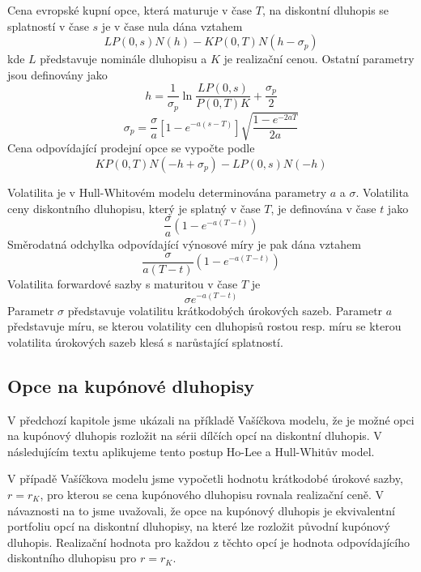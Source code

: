 \documentclass[a4paper]{book}
\begin{document}
Cena evropské kupní opce, která maturuje v čase $T$, na diskontní dluhopis se splatností v čase $s$ je v čase nula dána vztahem
\begin{equation*}
LP(0,s)N(h)-KP(0,T)N(h-\sigma_p)
\end{equation*}
kde $L$ představuje nominále dluhopisu a $K$ je realizační cenou. Ostatní parametry jsou definovány jako
\begin{equation*}
h = \frac{1}{\sigma_p} \ln \frac{LP(0,s)}{P(0,T)K}+\frac{\sigma_p}{2}
\end{equation*}
\begin{equation*}
\sigma_p = \frac{\sigma}{a}[1-e^{-a(s-T)}]\sqrt{\frac{1-e^{-2aT}}{2a}}
\end{equation*}
Cena odpovídající prodejní opce se vypočte podle
\begin{equation*}
KP(0,T)N(-h + \sigma_p)-LP(0,s)N(-h)
\end{equation*}

Volatilita je v Hull-Whitovém modelu determinována parametry $a$ a $\sigma$. Volatilita ceny diskontního dluhopisu, který je splatný v čase $T$, je definována v čase $t$ jako
\begin{equation*}
\frac{\sigma}{a}(1-e^{-a(T-t)})
\end{equation*}
Směrodatná odchylka odpovídající výnosové míry je pak dána vztahem
\begin{equation*}
\frac{\sigma}{a(T-t)}(1-e^{-a(T-t)})
\end{equation*}
Volatilita forwardové sazby s maturitou v čase $T$ je
\begin{equation*}
\sigma e^{-a(T-t)}
\end{equation*}
Parametr $\sigma$ představuje volatilitu krátkodobých úrokových sazeb. Parametr $a$ představuje míru, se kterou volatility cen dluhopisů rostou resp. míru se kterou volatilita úrokových sazeb klesá s narůstající splatností.

\subsection{Opce na kupónové dluhopisy}

V předchozí kapitole jsme ukázali na příkladě Vašíčkova modelu, že je možné opci na kupónový dluhopis rozložit na sérii dílčích opcí na diskontní dluhopis. V následujícím textu aplikujeme tento postup Ho-Lee a Hull-Whitův model.

V případě Vašíčkova modelu jsme vypočetli hodnotu krátkodobé úrokové sazby, $r = r_K$, pro kterou se cena kupónového dluhopisu rovnala realizační ceně. V návaznosti na to jsme uvažovali, že opce na kupónový dluhopis je ekvivalentní portfoliu opcí na diskontní dluhopisy, na které lze rozložit původní kupónový dluhopis. Realizační hodnota pro každou z těchto opcí je hodnota odpovídajícího diskontního dluhopisu pro $r = r_K$.
\end{document}
